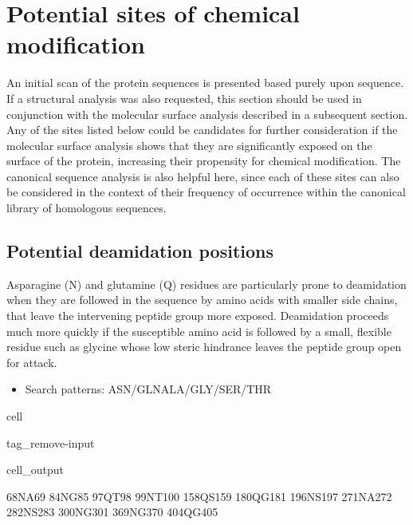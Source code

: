 \documentclass[letterpaper,10pt,english]{jupyterBook}
\begin{document}
\section{Potential sites of chemical modification}
\label{\detokenize{ipynb/chapter1:potential-sites-of-chemical-modification}}
\sphinxAtStartPar
An initial scan of the protein sequences is presented based purely upon sequence. If a structural analysis was also requested, this section should be used in conjunction with the molecular surface analysis described in a subsequent section. Any of the sites listed below could be candidates for further consideration if the molecular surface analysis shows that they are significantly exposed on the surface of the protein, increasing their propensity for chemical modification. The canonical sequence analysis is also helpful here, since each of these sites can also be considered in the context of their frequency of occurrence within the canonical library of homologous sequences.


\subsection{Potential deamidation positions}
\label{\detokenize{ipynb/chapter1:potential-deamidation-positions}}
\sphinxAtStartPar
Asparagine (N) and glutamine (Q) residues are particularly prone to deamidation when they are followed in the sequence by amino acids with smaller side chains, that leave the intervening peptide group more exposed. Deamidation proceeds much more quickly if the susceptible amino acid is followed by a small, flexible residue such as glycine whose low steric hindrance leaves the peptide group open for attack.
\begin{itemize}
\item {} 
\sphinxAtStartPar
Search patterns: ASN/GLN\sphinxhyphen{}ALA/GLY/SER/THR

\end{itemize}

\begin{sphinxuseclass}{cell}
\begin{sphinxuseclass}{tag_remove-input}\begin{sphinxVerbatimOutput}

\begin{sphinxuseclass}{cell_output}
\begin{sphinxVerbatim}[commandchars=\\\{\}]
68\PYGZhy{}NA\PYGZhy{}69
84\PYGZhy{}NG\PYGZhy{}85
97\PYGZhy{}QT\PYGZhy{}98
99\PYGZhy{}NT\PYGZhy{}100
158\PYGZhy{}QS\PYGZhy{}159
180\PYGZhy{}QG\PYGZhy{}181
196\PYGZhy{}NS\PYGZhy{}197
271\PYGZhy{}NA\PYGZhy{}272
282\PYGZhy{}NS\PYGZhy{}283
300\PYGZhy{}NG\PYGZhy{}301
369\PYGZhy{}NG\PYGZhy{}370
404\PYGZhy{}QG\PYGZhy{}405
\end{sphinxVerbatim}

\end{sphinxuseclass}\end{sphinxVerbatimOutput}

\end{sphinxuseclass}
\end{sphinxuseclass}
\end{document}
